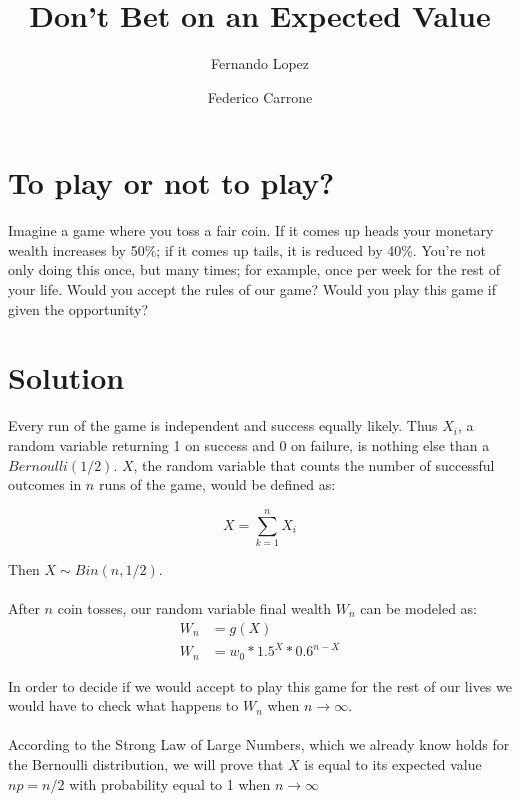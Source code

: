 \documentclass[12pt]{article}
\title{Don't Bet on an Expected Value}
\author{Fernando Lopez \and Federico Carrone}
\begin{document}
\maketitle
{}

\section{To play or not to play?}

Imagine a game where you toss a fair coin. If it comes up heads your monetary wealth increases by 50\%; if it comes up tails, it is reduced by 40\%. You’re not only doing this once, but many times; for example, once per week for the rest of your life. Would you accept the rules of our game? Would you play this game if given the opportunity?

\section{Solution}
Every run of the game is independent and success equally likely. Thus $X_i$, a random variable returning 1 on success and 0 on failure, is nothing else than a $Bernoulli(1/2)$. $X$, the random variable that counts the number of successful outcomes in $n$ runs of the game, would be defined as:

\begin{equation*}
 X = \sum\limits_{k=1}^{n} X_i
\end{equation*}

Then $X \sim Bin(n, 1/2)$.
\\\\
After $n$ coin tosses, our random variable final wealth $W_n$ can be modeled as:
\begin{equation*}
  \begin{split}
    W_n &= g(X)\\
    W_n &= w_0 * 1.5^X * 0.6^{n-X}
  \end{split}
\end{equation*}

In order to decide if we would accept to play this game for the rest of our lives we would have to check what happens to $W_n$ when $n \rightarrow \infty$.
\\\\
According to the Strong Law of Large Numbers, which we already know holds for the Bernoulli distribution, we will prove that $X$ is equal to its expected value $np = n/2$ with probability equal to 1 when $n \rightarrow \infty$
\end{document}
